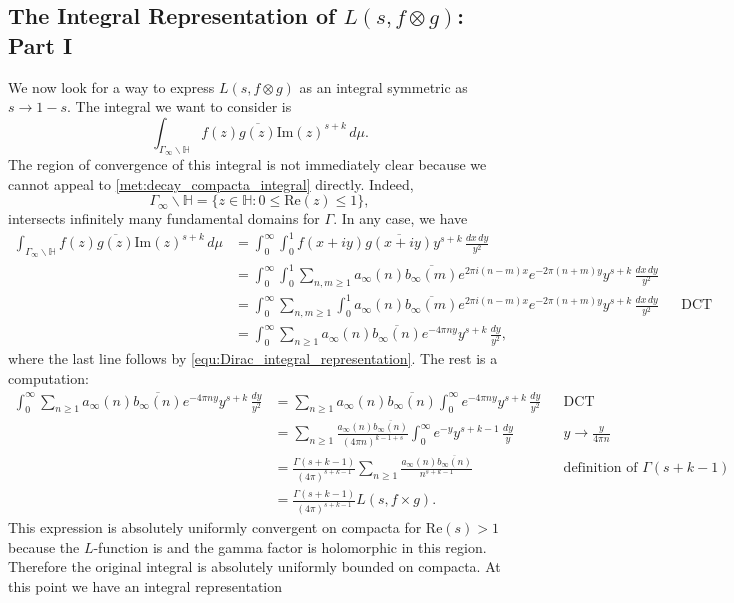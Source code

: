 \documentclass[12pt]{book}
\theoremstyle{definition}\newframedtheorem{method}{Method}
\renewcommand{\H}{\mathbb{H}}
\newcommand{\G}{\Gamma}
\newcommand{\x}{\times}
\newcommand{\ox}{\otimes}
\newcommand{\<}{\langle}
\renewcommand{\>}{\rangle}
\newcommand{\conj}{\overline}
\renewcommand{\Re}{\mathrm{Re}}
\renewcommand{\Im}{\mathrm{Im}}
\begin{document}
    \subsection*{The Integral Representation of \texorpdfstring{$L(s,f \ox g)$}{L(s,fxg)}: Part I}
      We now look for a way to express $L(s,f \ox g)$ as an integral symmetric as $s \to 1-s$. The integral we want to consider is
      \[
        \int_{\G_{\infty}\backslash\H}f(z)\conj{g(z)}\Im(z)^{s+k}\,d\mu.
      \]
      The region of convergence of this integral is not immediately clear because we cannot appeal to \cref{met:decay_compacta_integral} directly. Indeed,
      \[
        \G_{\infty}\backslash\H = \{z \in \H:0 \le \Re(z) \le 1 \},
      \]
      intersects infinitely many fundamental domains for $\G$. In any case, we have
      \begin{align*}
        \int_{\G_{\infty}\backslash\H}f(z)\conj{g(z)}\Im(z)^{s+k}\,d\mu &= \int_{0}^{\infty}\int_{0}^{1}f(x+iy)\conj{g(x+iy)}y^{s+k}\,\frac{dx\,dy}{y^{2}} \\
        &= \int_{0}^{\infty}\int_{0}^{1}\sum_{n,m \ge 1}a_{\infty}(n)\conj{b_{\infty}(m)}e^{2\pi i(n-m)x}e^{-2\pi(n+m)y}y^{s+k}\,\frac{dx\,dy}{y^{2}} \\
        &= \int_{0}^{\infty}\sum_{n,m \ge 1}\int_{0}^{1}a_{\infty}(n)\conj{b_{\infty}(m)}e^{2\pi i(n-m)x}e^{-2\pi(n+m)y}y^{s+k}\,\frac{dx\,dy}{y^{2}} && \text{DCT} \\
        &= \int_{0}^{\infty}\sum_{n \ge 1}a_{\infty}(n)\conj{b_{\infty}(n)}e^{-4\pi ny}y^{s+k}\,\frac{dy}{y^{2}},
      \end{align*}
      where the last line follows by \cref{equ:Dirac_integral_representation}. The rest is a computation:
      \begin{align*}
        \int_{0}^{\infty}\sum_{n \ge 1}a_{\infty}(n)\conj{b_{\infty}(n)}e^{-4\pi ny}y^{s+k}\,\frac{dy}{y^{2}} &= \sum_{n \ge 1}a_{\infty}(n)\conj{b_{\infty}(n)}\int_{0}^{\infty}e^{-4\pi ny}y^{s+k}\,\frac{dy}{y^{2}} &&\text{DCT} \\
        &= \sum_{n \ge 1}\frac{a_{\infty}(n)\conj{b_{\infty}(n)}}{(4\pi n)^{k-1+s}}\int_{0}^{\infty}e^{-y}y^{s+k-1}\,\frac{dy}{y} &&\text{$y \to \frac{y}{4\pi n}$} \\
        &= \frac{\G(s+k-1)}{(4\pi)^{s+k-1}}\sum_{n \ge 1}\frac{a_{\infty}(n)\conj{b_{\infty}(n)}}{n^{s+k-1}} &&\text{definition of $\G(s+k-1)$} \\
        &= \frac{\G(s+k-1)}{(4\pi)^{s+k-1}}L(s,f \x g).
      \end{align*}
      This expression is absolutely uniformly convergent on compacta for $\Re(s) > 1$ because the $L$-function is and the gamma factor is holomorphic in this region. Therefore the original integral is absolutely uniformly bounded on compacta. At this point we have an integral representation
\end{document}
